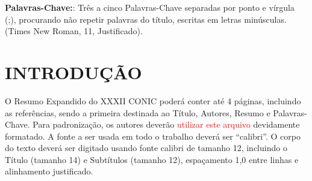 \documentclass[a4paper,11pt]{article} %
\begin{document}





\begin{abstract}
\noindent A primeira página deve constar apenas: Título, Autores, Resumo e Palavras-Chave. O Resumo é elemento obrigatório, não devendo ultrapassar 200 (duzentas) palavras. No Resumo deve ser apresentado o problema em estudo, os métodos utilizados, os resultados mais importantes e as conclusões obtidas. O Resumo não deve extrapolar para a segunda página. Xxxx xxxxx xxxxxxxx xxxxxxxxxxx xxx xxxxxxxx xxxxxxx xxxxx xxxxx xxxx xxx xxxxx xxxxxxxx xxxxxxxxxxx xxx xxxxxxxx xxxxxxx xxxxx xxxxx xxxx xxx xxxxx xxxxxxxx xxxxxxxxxxx xxx xxxxxxxx xxxxxxx xxxxx xxxxx xxxx xxx xxxxx xxxxxxxx xxxxxxxxxxx xxx xxxxxxxx xxxxxxx xxxxx xxxxx xxxx xxx xxxxx xxxxxxxx xxxxxxxxxxx xxx xxxxxxxx xxxxxxx xxxxx xxxxx xxxx xxx xxxxx xxxxxxxx xxxxxxxxxxx xxx xxxxxxxx xxxxxxx xxxxx xxxxx xxxx xxx xxxxx xxxxxxxx xxxxxxxx xxx xxxxxxxx xxxxxxx xxxxx xxxxx xxxx xxx xxxxx xxxxxxxx xxxxxxxxxxx xxx xxxxxxxx xxxxxxx xxxxx xxxxx xxxx xxx xxxxx xxxxxxxx xxxxxxxxxxx xxx xxxxxxxx xxxxxxx xxxxx xxxxx xxxx xxx xxxxx xxxxxxxx xxxxxxxxxxx xxx xxxxxxxx xxxxxxx xxxxx xxxxx xxxx xxxx xxx xxxxx xxxxxx xxxxxx xxx xxxxx xxxxxxx xxxxx xxxxx xxxx xxx xxxxx xxxxxxxx xxxxxxxxxxx xxx xxxxxxxx xxxxxxx xxxxx xxxxx xxxx. Xxxx xxxxx xxxxxxxx xxxxxxxxxxx xxx xxxxxxxx xxxxxxx xxxxx xxxxx xxxx xxx xxxxx xxxxxxxx xxxxxxxxxxx xxx xxxxxxxx xxxxxxx xxxxx xxxxx xxxx xxx xxxxxxxx xxxxxxx xxxxx xxxx xxxx xxxxx xxxx.
\end{abstract}


\vspace{0.5cm}
\noindent\textbf{Palavras-Chave:}: Três a cinco Palavras-Chave separadas por ponto e vírgula (;), procurando não repetir palavras do título, escritas em letras minúsculas. (Times New Roman, 11, Justificado).


\section{INTRODUÇÃO}

O Resumo Expandido do XXXII CONIC poderá conter até 4 páginas, incluindo as referências, sendo a primeira destinada ao Título, Autores, Resumo e Palavras-Chave. Para padronização, os autores deverão \textcolor{red}{utilizar este arquivo} devidamente formatado. A fonte a ser usada em todo o trabalho deverá ser “calibri”. O corpo do texto deverá ser digitado usando fonte calibri de tamanho 12, incluindo o Título (tamanho 14) e Subtítulos (tamanho 12), espaçamento 1,0 entre linhas e alinhamento justificado.
\end{document}
